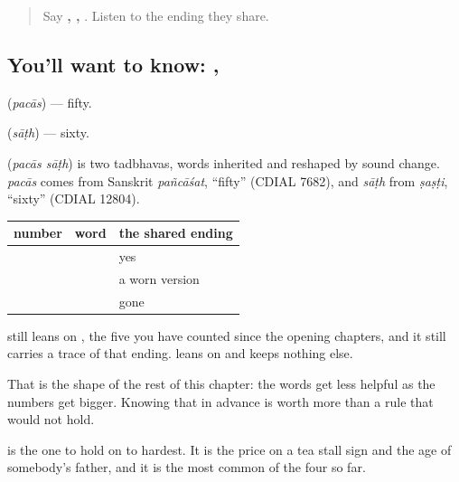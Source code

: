 \label{lesson:HI-C96-pachaas-saath}



\begin{quote}
Say \textbf{, , }. Listen to the ending they share.
\end{quote}

\subsection*{You'll want to know: , }
\textbf{} (\emph{pacās}) — fifty.

\textbf{} (\emph{sāṭh}) — sixty.

\begin{cousinweb}
\textbf{ } (\emph{pacās sāṭh}) is two tadbhavas, words inherited and reshaped by sound change. \emph{pacās} comes from Sanskrit \emph{pañcāśat}, \textquotedblleft{}fifty\textquotedblright{} (CDIAL 7682), and \emph{sāṭh} from \emph{ṣaṣṭi}, \textquotedblleft{}sixty\textquotedblright{} (CDIAL 12804).
\end{cousinweb}

\begin{grammarlens}[title={Grammar Lens: one keeps the ending, one drops it}]
\noindent
\begin{tabularx}{\linewidth}{@{}>{\raggedright\arraybackslash}X>{\raggedright\arraybackslash}X>{\raggedright\arraybackslash}X@{}}
\toprule
\textbf{number} & \textbf{word} & \textbf{the shared ending} \\
\midrule
40 & \hi{चालीस} & yes \\
50 & \hi{पचास} & a worn version \\
60 & \hi{साठ} & gone \\
\bottomrule
\end{tabularx}

\textbf{} still leans on \textbf{}, the five you have counted since the opening chapters, and it still carries a trace of that ending. \textbf{} leans on \textbf{} and keeps nothing else.

That is the shape of the rest of this chapter: the words get less helpful as the numbers get bigger. Knowing that in advance is worth more than a rule that would not hold.

\textbf{} is the one to hold on to hardest. It is the price on a tea stall sign and the age of somebody's father, and it is the most common of the four so far.
\end{grammarlens}


